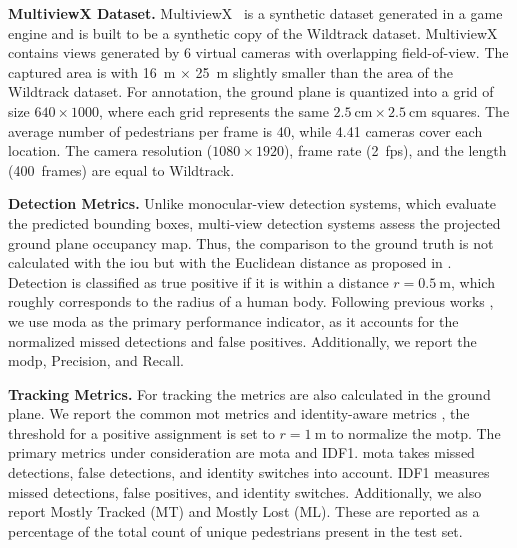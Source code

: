 \documentclass[10pt,twocolumn,letterpaper]{article}
\newcommand{\nparagraph}[1]{\noindent\textbf{#1.  }}
\begin{document}
\nparagraph{MultiviewX Dataset} MultiviewX~\cite{hou2020multiview} is a synthetic dataset generated in a game engine and is built to be a synthetic copy of the Wildtrack dataset.
MultiviewX contains views generated by 6 virtual cameras with overlapping field-of-view. The captured area is with \qty{16}{\metre} $\times$ \qty{25}{\metre} slightly smaller than the area of the Wildtrack dataset. For annotation, the ground plane is quantized into a grid of size $640 \times 1000$, where each grid represents the same $\qty{2.5}{\cm} \times \qty{2.5}{\cm}$ squares. The average number of pedestrians per frame is 40, while 4.41 cameras cover each location. The camera resolution ($1080 \times 1920$), frame rate (\qty{2}{fps}), and the length (\qty{400}{frames}) are equal to Wildtrack.

\nparagraph{Detection Metrics}
Unlike monocular-view detection systems, which evaluate the predicted bounding boxes, multi-view detection systems assess the projected ground plane occupancy map. Thus, the comparison to the ground truth is not calculated with the \gls{iou} but with the Euclidean distance as proposed in \cite{chavdarova2018wildtrack}. Detection is classified as true positive if it is within a distance $r = \qty{0.5}{\metre}$, which roughly corresponds to the radius of a human body. Following previous works \cite{chavdarova2018wildtrack, hou2020multiview}, we use \gls{moda} as the primary performance indicator, as it accounts for the normalized missed detections and false positives. Additionally, we report the \gls{modp}, Precision, and Recall.

\nparagraph{Tracking Metrics}
For tracking the metrics are also calculated in the ground plane. We report the common \gls{mot} metrics \cite{bernardin2008evaluating} and identity-aware metrics \cite{ristani2016performance}, the threshold for a positive assignment is set to $r = \qty{1}{\metre}$ to normalize the \gls{motp}. The primary metrics under consideration are \gls{mota} and IDF1.
\gls{mota} takes missed detections, false detections, and identity switches into account. IDF1 measures missed detections, false positives, and identity switches.
Additionally, we also report Mostly Tracked (MT) and Mostly Lost (ML). These are reported as a percentage of the total count of unique pedestrians present in the test set.
\end{document}
